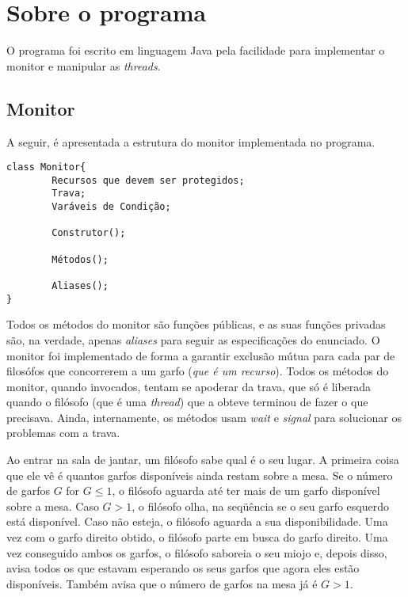 \documentclass[11pt]{article}
\begin{document}
\section{Sobre o programa}

O programa foi escrito em linguagem Java pela facilidade para implementar o monitor e manipular as \textit{threads}.

\pagebreak

\subsection{Monitor}

A seguir, é apresentada a estrutura do monitor implementada no programa.

\begin{verbatim}
class Monitor{
	    Recursos que devem ser protegidos;
	    Trava;
	    Varáveis de Condição;

	    Construtor();

	    Métodos();

	    Aliases();
}
\end{verbatim}

Todos os métodos do monitor são funções públicas, e as suas funções privadas são, na verdade, apenas \textit{aliases} para seguir as especificações do enunciado. O monitor foi implementado de forma a garantir exclusão mútua para cada par de filosófos que concorrerem a um garfo (\textit{que é um recurso}). Todos os métodos do monitor, quando invocados, tentam se apoderar da trava, que só é liberada quando o filósofo (que é uma \textit{thread}) que a obteve terminou de fazer o que precisava. Ainda, internamente, os métodos usam \textit{wait} e \textit{signal} para solucionar os problemas com a trava.

Ao entrar na sala de jantar, um filósofo sabe qual é o seu lugar. A primeira coisa que ele vê é quantos garfos disponíveis ainda restam sobre a mesa. Se o número de garfos $G$ for $G \leq 1$, o filósofo aguarda até ter mais de um garfo disponível sobre a mesa. Caso $G > 1$, o filósofo olha, na seqüência se o seu garfo esquerdo está disponível. Caso não esteja, o filósofo aguarda a sua disponibilidade. Uma vez com o garfo direito obtido, o filósofo parte em busca do garfo direito. Uma vez conseguido ambos os garfos, o filósofo saboreia o seu miojo e, depois disso, avisa todos os que estavam esperando os seus garfos que agora eles estão disponíveis. Também avisa que o número de garfos na mesa já é $G > 1$.

\pagebreak
\end{document}
